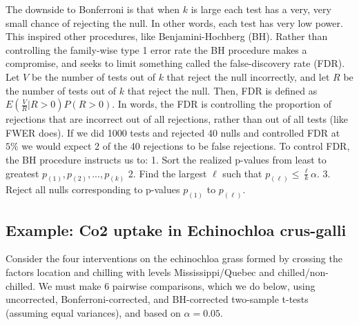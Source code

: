 \documentclass[
]{book}
\begin{document}
The downside to Bonferroni is that when \(k\) is large each test has a very, very small chance of rejecting the null. In other words, each test has very low power. This inspired other procedures, like Benjamini-Hochberg (BH). Rather than controlling the family-wise type 1 error rate the BH procedure makes a compromise, and seeks to limit something called the false-discovery rate (FDR). Let \(V\) be the number of tests out of \(k\) that reject the null incorrectly, and let \(R\) be the number of tests out of \(k\) that reject the null. Then, FDR is defined as \(E(\frac{V}{R}|R>0)P(R>0)\). In words, the FDR is controlling the proportion of rejections that are incorrect out of all rejections, rather than out of all tests (like FWER does). If we did 1000 tests and rejected 40 nulls and controlled FDR at \(5\%\) we would expect 2 of the 40 rejections to be false rejections. To control FDR, the BH procedure instructs us to:
1. Sort the realized p-values from least to greatest \(p_{(1)}, p_{(2)}, ..., p_{(k)}\)
2. Find the largest \(\ell\) such that \(p_{(\ell)}\leq \frac{\ell}{k}\alpha\).
3. Reject all nulls corresponding to p-values \(p_{(1)}\) to \(p_{(\ell)}\).

\hypertarget{example-co2-uptake-in-echinochloa-crus-galli}{%
\subsection{Example: Co2 uptake in Echinochloa crus-galli}\label{example-co2-uptake-in-echinochloa-crus-galli}}

Consider the four interventions on the echinochloa grass formed by crossing the factors location and chilling with levels Mississippi/Quebec and chilled/non-chilled. We must make 6 pairwise comparisons, which we do below, using uncorrected, Bonferroni-corrected, and BH-corrected two-sample t-tests (assuming equal variances), and based on \(\alpha = 0.05\).
\end{document}
